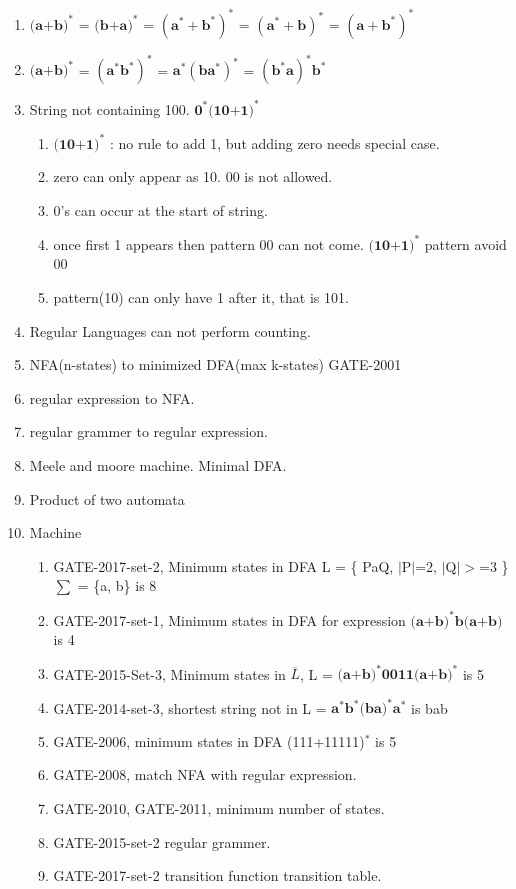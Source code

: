 \begin{enumerate}
    \item \( \mathbf { \text{(a+b)}^* } \) = \( \mathbf { \text{(b+a)}^* } \)
        = \( \mathbf { (\text{a}^* + \text{b}^*)^*} \) = \( \mathbf { (\text{a}^* + \text{b})^*} \)  = \( \mathbf { (\text{a} + \text{b}^*)^*} \)
    \item \( \mathbf { \text{(a+b)}^* } \) = \( \mathbf { (\text{a}^*\text{b}^*)^*} \) = \( \mathbf { \text{a}^* (\text{b}\text{a}^*)^* } \)
        = \( \mathbf { (\text{b}^*\text{a})^* \text{b}^* } \)
    \item String not containing 100. \qquad \( \mathbf { \text{0}^*\text{(10+1)}^* } \)
    \begin{enumerate}
        \item \( \mathbf { \text{(10+1)}^* } \) : no rule to add 1, but adding zero needs special case.
        \item zero can only appear as 10. 00 is not allowed.
        \item 0's can occur at the start of string.
        \item once first 1 appears then pattern 00 can not come. \( \mathbf { \text{(10+1)}^* } \) pattern avoid 00
        \item pattern(10) can only have 1 after it, that is 101.
    \end{enumerate}
    \item Regular Languages can not perform counting.
    \item NFA(n-states) to minimized DFA(max k-states) GATE-2001
    \item regular expression to NFA.
    \item regular grammer to regular expression.
    \item Meele and moore machine. Minimal DFA.
    \item Product of two automata
    \item Machine
    \begin{enumerate}
    \item GATE-2017-set-2, Minimum states in DFA \quad L = \{ PaQ,  \( |\text{P}|\text{=2, } | \text{Q}|>\text{=3} \) \}
          \quad \(\sum\) = \{a, b\} is 8
    \item GATE-2017-set-1, Minimum states in DFA for expression \( \mathbf { \text{(a+b)}^* \text{b} \text{(a+b)} } \)  is 4
    \item GATE-2015-Set-3, Minimum states in \( \overline{L} \), L = \( \mathbf { \text{(a+b)}^* \text{0011} \text{(a+b)}^* } \)  is 5
    \item GATE-2014-set-3, shortest string not in L =  \( \mathbf { \text{a}^*\text{b}^*\text{(ba)}^*\text{a}^*} \) is bab
    \item GATE-2006, minimum states in DFA (111+11111)\(^*\) is 5
    \item GATE-2008, match NFA with regular expression.
    \item GATE-2010, GATE-2011, minimum number of states.
    \item GATE-2015-set-2 regular grammer.
    \item GATE-2017-set-2 transition function transition table.


\end{enumerate}
\end{enumerate}
